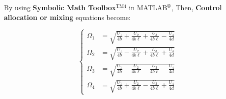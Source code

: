 \begin{small}


By using \textbf{Symbolic Math Toolbox}$^{\text{TM4}}$ in MATLAB$^{\text{\textregistered}}$, 
Then, \textbf{Control allocation or mixing} equations become:





\begin{equation}
\left\{
\begin{aligned}
 \Omega_1 &= \sqrt{\tfrac{U_1}{4b} + \tfrac{U_2}{4b\ell} + \tfrac{U_3}{4b\ell} - \tfrac{U_4}{4d}} \\[8pt]
    \Omega_2 &= \sqrt{\tfrac{U_1}{4b} - \tfrac{U_2}{4b\ell} + \tfrac{U_3}{4b\ell} + \tfrac{U_4}{4d}} \\[8pt]
    \Omega_3 &= \sqrt{\tfrac{U_1}{4b} - \tfrac{U_2}{4b\ell} - \tfrac{U_3}{4b\ell} - \tfrac{U_4}{4d}} \\[8pt]
    \Omega_4 &= \sqrt{\tfrac{U_1}{4b} + \tfrac{U_2}{4b\ell} - \tfrac{U_3}{4b\ell} + \tfrac{U_4}{4d}} 
\end{aligned}
\right.
\label{3.25}
\end{equation}


\end{small}
